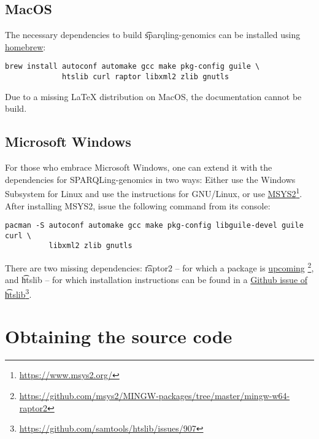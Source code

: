 \subsection{MacOS}

  The necessary dependencies to build \t{sparqling-genomics} can be
  installed using \href{https://brew.sh/}{homebrew}:

\begin{siderules}
\begin{verbatim}
brew install autoconf automake gcc make pkg-config guile \
             htslib curl raptor libxml2 zlib gnutls
\end{verbatim}
\end{siderules}

  Due to a missing \LaTeX{} distribution on MacOS, the documentation
  cannot be build.

\subsection{Microsoft Windows}

  For those who embrace Microsoft Windows, one can extend it with the
  dependencies for SPARQLing-genomics in two ways: Either use the Windows
  Subsystem for Linux and use the instructions for GNU/Linux, or use
  \href{https://www.msys2.org/}{MSYS2}\footnote{\url{https://www.msys2.org/}}.
  After installing MSYS2, issue the following command from its console:

\begin{siderules}
\begin{verbatim}
pacman -S autoconf automake gcc make pkg-config libguile-devel guile curl \
          libxml2 zlib gnutls
\end{verbatim}
\end{siderules}

  There are two missing dependencies: \t{raptor2} -- for which a package is
  \href{https://github.com/msys2/MINGW-packages/tree/master/mingw-w64-raptor2}{upcoming}%
  \footnote{\url{https://github.com/msys2/MINGW-packages/tree/master/mingw-w64-raptor2}},
  and \t{htslib} -- for which installation instructions can be found in a
  \href{https://github.com/samtools/htslib/issues/907}{Github issue of
    \t{htslib}}\footnote{\url{https://github.com/samtools/htslib/issues/907}}.

\section{Obtaining the source code}
\label{sec:obtaining-tarball}

